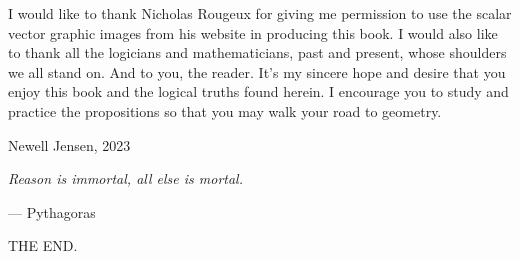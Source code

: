 \documentclass[twoside,11pt]{report}
\begin{document}
I would like to thank Nicholas Rougeux for giving me permission to use the scalar vector graphic images from his website in producing this book.  I would also like to thank all the logicians and mathematicians, past and present, whose shoulders we all stand on.  And to you, the reader.  It's my sincere hope and desire that you enjoy this book and the logical truths found herein.  I encourage you to study and practice the propositions so that you may walk your {\color{cred}{o}}{\color{cblue}{w}}{\color{cyellow}{n}} road to geometry.

\hfill

\begin{flushright}
  Newell Jensen, 2023
\end{flushright}

\newpage

\vspace*{\fill}

\begin{center}
  \textit{Reason is immortal, all else is mortal.}

  \hspace{8em}--- Pythagoras
\end{center}

\vspace*{\fill}

\newpage

\tableofcontents

\newpage










\newpage

\thispagestyle{empty}
\vspace*{\fill}
\begin{center}
  \scshape{\LARGE{THE END.}}
\end{center}
\vspace*{\fill}
\end{document}
